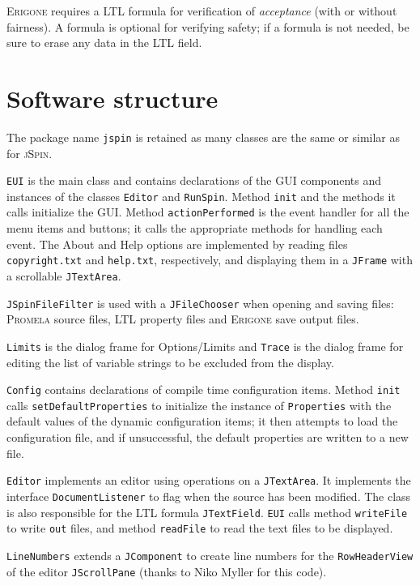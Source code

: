 \documentclass[11pt]{article}
\newcommand{\eri}{\textsc{Erigone}}
\newcommand{\prm}{\textsc{Promela}}
\newcommand{\js}{\textsc{jSpin}}
\newcommand{\p}[1]{\texttt{#1}}
\newcommand{\bu}[1]{\textsf{#1}}
\begin{document}
\eri{} requires a LTL formula for verification of \emph{acceptance}
(with or without fairness). A formula is optional for verifying safety;
if a formula is not needed, be sure to erase any data in the LTL field.

\newpage

\section{Software structure}

The package name \p{jspin} is retained as many classes are the same or
similar as for \js{}.

\p{EUI} is the main class and contains declarations
of the GUI components and instances
of the classes \p{Editor} and \p{RunSpin}.
Method \p{init} and the methods it calls initialize the GUI.
Method \p{action\-Per\-formed} is the event handler for all the menu items
and buttons; it calls the appropriate methods for handling each event.
The \bu{About} and \bu{Help} options are implemented by reading files
\p{copyright.txt} and \p{help.txt}, respectively, and displaying
them in a \p{JFrame} with a scrollable \p{JTextArea}.

\p{JSpinFileFilter} is used with a \p{JFileChooser}
when opening and saving files: \prm{} source files,
LTL property files and \eri{} save output files.

\p{Limits} is the dialog frame for \bu{Options/Limits} and \p{Trace} is
the dialog frame for editing the list of variable strings to be excluded
from the display.

\p{Config} contains declarations of compile time configuration items.
Method \p{init} calls \p{set\-Default\-Properties} to initialize the instance
of \p{Properties} with the default values of the dynamic configuration
items; it then attempts to load the configuration file, and if unsuccessful,
the default properties are written to a new file.

\p{Editor} implements an editor using operations on a
\p{JTextArea}. It implements the interface \p{Document\-Listener} to flag
when the source has been modified. The class is also responsible
for the LTL formula \p{JTextField}. \p{EUI} calls method \p{writeFile}
to write \p{out} files, and method \p{readFile} to read
the text files to be displayed.

\p{LineNumbers} extends a \p{JComponent} to create line numbers
for the \p{RowHeaderView} of the editor \p{JScrollPane}
(thanks to Niko Myller for this code).
\end{document}
